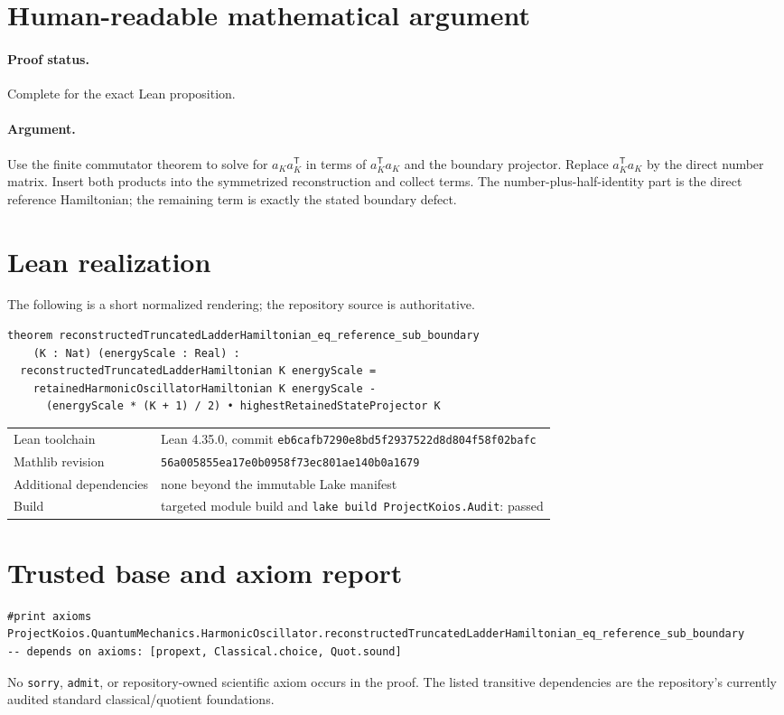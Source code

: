 \documentclass[11pt]{article}
\begin{document}
\section{Human-readable mathematical argument}
\paragraph{Proof status.} Complete for the exact Lean proposition.
\paragraph{Argument.} Use the finite commutator theorem to solve for $a_Ka_K^{\mathsf T}$ in terms of $a_K^{\mathsf T}a_K$ and the boundary projector.  Replace $a_K^{\mathsf T}a_K$ by the direct number matrix.  Insert both products into the symmetrized reconstruction and collect terms.  The number-plus-half-identity part is the direct reference Hamiltonian; the remaining term is exactly the stated boundary defect.

\section{Lean realization}
The following is a short normalized rendering; the repository source is authoritative.
\begin{lstlisting}
theorem reconstructedTruncatedLadderHamiltonian_eq_reference_sub_boundary
    (K : Nat) (energyScale : Real) :
  reconstructedTruncatedLadderHamiltonian K energyScale =
    retainedHarmonicOscillatorHamiltonian K energyScale -
      (energyScale * (K + 1) / 2) • highestRetainedStateProjector K
\end{lstlisting}
\begin{tabularx}{\textwidth}{@{}lY@{}}\toprule
Lean toolchain & Lean 4.35.0, commit \texttt{eb6cafb7290e8bd5f2937522d8d804f58f02bafc} \\
Mathlib revision & \texttt{56a005855ea17e0b0958f73ec801ae140b0a1679} \\
Additional dependencies & none beyond the immutable Lake manifest \\
Build & targeted module build and \texttt{lake build ProjectKoios.Audit}: passed \\
\bottomrule\end{tabularx}

\section{Trusted base and axiom report}
\begin{lstlisting}
#print axioms ProjectKoios.QuantumMechanics.HarmonicOscillator.reconstructedTruncatedLadderHamiltonian_eq_reference_sub_boundary
-- depends on axioms: [propext, Classical.choice, Quot.sound]
\end{lstlisting}
No \texttt{sorry}, \texttt{admit}, or repository-owned scientific axiom occurs in the
proof. The listed transitive dependencies are the repository's currently audited standard
classical/quotient foundations.
\end{document}
